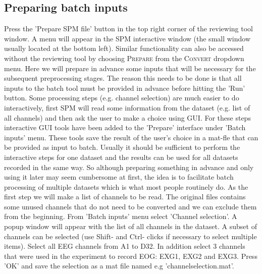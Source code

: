 \subsection{Preparing batch inputs}
Press the 'Prepare SPM file' button in the top right corner of the reviewing tool window. A menu will appear in the SPM interactive window (the small window usually located at the bottom left). Similar functionality can also be accessed without the reviewing tool by choosing \textsc{Prepare} from the \textsc{Convert} dropdown menu. Here we will prepare in advance some inputs that will be necessary for the subsequent preprocessing stages. The reason this needs to be done is that all inputs to the batch tool must be provided in advance before hitting the 'Run' button. Some processing steps (e.g. channel selection) are much easier to do interactively, first SPM will read some information from the dataset (e.g. list of all channels) and then ask the user to make a choice using GUI. For these steps interactive GUI tools have been added to the 'Prepare' interface under 'Batch inputs' menu. These tools save the result of the user's choice in a mat-fle that can be provided as input to batch. Usually it should be sufficient to perform the interactive steps for one dataset and the results can be used for all datasets recorded in the same way. So although preparing something in advance and only using it later may seem cumbersome at first, the idea is to facilitate batch processing of multiple datasets which is what most people routinely do.  As the first step we will make a list of channels to be read. The original files contains some unused channels that do not need to be converted and we can exclude them from the beginning. From 'Batch inputs' menu select 'Channel selection'. A popup window will appear with the list of all channels in the dataset. A subset of channels can be selected (use Shift- and Ctrl- clicks if necessary to select multiple items). Select all EEG channels from A1 to D32. In addition select 3 channels that were used in the experiment to record EOG: EXG1, EXG2 and EXG3. Press 'OK' and save the selection as a mat file named e.g 'channelselection.mat'.


